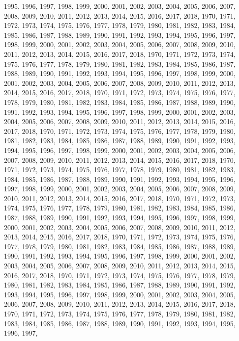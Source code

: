 \documentclass[
]{article}
\begin{document}
1995, 1996, 1997, 1998, 1999, 2000, 2001, 2002, 2003, 2004, 2005, 2006,
2007, 2008, 2009, 2010, 2011, 2012, 2013, 2014, 2015, 2016, 2017, 2018,
1970, 1971, 1972, 1973, 1974, 1975, 1976, 1977, 1978, 1979, 1980, 1981,
1982, 1983, 1984, 1985, 1986, 1987, 1988, 1989, 1990, 1991, 1992, 1993,
1994, 1995, 1996, 1997, 1998, 1999, 2000, 2001, 2002, 2003, 2004, 2005,
2006, 2007, 2008, 2009, 2010, 2011, 2012, 2013, 2014, 2015, 2016, 2017,
2018, 1970, 1971, 1972, 1973, 1974, 1975, 1976, 1977, 1978, 1979, 1980,
1981, 1982, 1983, 1984, 1985, 1986, 1987, 1988, 1989, 1990, 1991, 1992,
1993, 1994, 1995, 1996, 1997, 1998, 1999, 2000, 2001, 2002, 2003, 2004,
2005, 2006, 2007, 2008, 2009, 2010, 2011, 2012, 2013, 2014, 2015, 2016,
2017, 2018, 1970, 1971, 1972, 1973, 1974, 1975, 1976, 1977, 1978, 1979,
1980, 1981, 1982, 1983, 1984, 1985, 1986, 1987, 1988, 1989, 1990, 1991,
1992, 1993, 1994, 1995, 1996, 1997, 1998, 1999, 2000, 2001, 2002, 2003,
2004, 2005, 2006, 2007, 2008, 2009, 2010, 2011, 2012, 2013, 2014, 2015,
2016, 2017, 2018, 1970, 1971, 1972, 1973, 1974, 1975, 1976, 1977, 1978,
1979, 1980, 1981, 1982, 1983, 1984, 1985, 1986, 1987, 1988, 1989, 1990,
1991, 1992, 1993, 1994, 1995, 1996, 1997, 1998, 1999, 2000, 2001, 2002,
2003, 2004, 2005, 2006, 2007, 2008, 2009, 2010, 2011, 2012, 2013, 2014,
2015, 2016, 2017, 2018, 1970, 1971, 1972, 1973, 1974, 1975, 1976, 1977,
1978, 1979, 1980, 1981, 1982, 1983, 1984, 1985, 1986, 1987, 1988, 1989,
1990, 1991, 1992, 1993, 1994, 1995, 1996, 1997, 1998, 1999, 2000, 2001,
2002, 2003, 2004, 2005, 2006, 2007, 2008, 2009, 2010, 2011, 2012, 2013,
2014, 2015, 2016, 2017, 2018, 1970, 1971, 1972, 1973, 1974, 1975, 1976,
1977, 1978, 1979, 1980, 1981, 1982, 1983, 1984, 1985, 1986, 1987, 1988,
1989, 1990, 1991, 1992, 1993, 1994, 1995, 1996, 1997, 1998, 1999, 2000,
2001, 2002, 2003, 2004, 2005, 2006, 2007, 2008, 2009, 2010, 2011, 2012,
2013, 2014, 2015, 2016, 2017, 2018, 1970, 1971, 1972, 1973, 1974, 1975,
1976, 1977, 1978, 1979, 1980, 1981, 1982, 1983, 1984, 1985, 1986, 1987,
1988, 1989, 1990, 1991, 1992, 1993, 1994, 1995, 1996, 1997, 1998, 1999,
2000, 2001, 2002, 2003, 2004, 2005, 2006, 2007, 2008, 2009, 2010, 2011,
2012, 2013, 2014, 2015, 2016, 2017, 2018, 1970, 1971, 1972, 1973, 1974,
1975, 1976, 1977, 1978, 1979, 1980, 1981, 1982, 1983, 1984, 1985, 1986,
1987, 1988, 1989, 1990, 1991, 1992, 1993, 1994, 1995, 1996, 1997, 1998,
1999, 2000, 2001, 2002, 2003, 2004, 2005, 2006, 2007, 2008, 2009, 2010,
2011, 2012, 2013, 2014, 2015, 2016, 2017, 2018, 1970, 1971, 1972, 1973,
1974, 1975, 1976, 1977, 1978, 1979, 1980, 1981, 1982, 1983, 1984, 1985,
1986, 1987, 1988, 1989, 1990, 1991, 1992, 1993, 1994, 1995, 1996, 1997,
\end{document}
